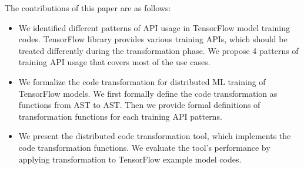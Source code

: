 The contributions of this paper are as follows:

\begin{itemize}
  \item We identified different patterns of API usage in TensorFlow model
        training codes. TensorFlow library provides various training APIs,
        which should be treated differently during the transformation phase.
        We propose 4 patterns of training API usage that covers
        most of the use cases.
  \item We formalize the code transformation for distributed ML training
        of TensorFlow models. We first formally define the code transformation
        as functions from AST to AST. Then we provide formal definitions of
        transformation functions for each training API patterns.
  \item We present the distributed code transformation tool, which implements
        the code transformation functions. We evaluate the tool's performance
        by applying transformation to TensorFlow example model codes.
\end{itemize}

